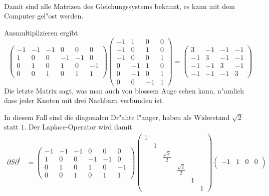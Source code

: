 \begin{loesung}
\begin{teilaufgaben}
\begin{align*}
\end{align*}
Damit sind alle Matrizen des Gleichungssystems bekannt, es kann mit
dem Computer gel"ost werden.
\item Ausmultiplizieren ergibt
\[
\begin{pmatrix}
-1&-1&-1& 0& 0& 0\\
 1& 0& 0&-1&-1& 0\\
 0& 1& 0& 1& 0&-1\\
 0& 0& 1& 0& 1& 1
\end{pmatrix}
\begin{pmatrix}
  -1&  1&  0&  0\\
  -1&  0&  1&  0\\
  -1&  0&  0&  1\\
   0& -1&  1&  0\\
   0& -1&  0&  1\\
   0&  0& -1&  1
\end{pmatrix}
=\begin{pmatrix}
   3& -1& -1& -1\\
  -1&  3& -1& -1\\
  -1& -1&  3& -1\\
  -1& -1& -1&  3
\end{pmatrix}
\]
Die letzte Matrix sagt, was man auch von blossem Auge sehen kann,
n"amlich dass jeder Knoten mit drei Nachbarn verbunden ist.
\item In diesem Fall sind die diagonalen Dr"ahte l"anger, haben
als Widerstand $\sqrt{2}$ statt $1$. Der Laplace-Operator wird 
damit
\begin{align*}
\partial S\partial^t
&=
\begin{pmatrix}
-1&-1&-1& 0& 0& 0\\
 1& 0& 0&-1&-1& 0\\
 0& 1& 0& 1& 0&-1\\
 0& 0& 1& 0& 1& 1
\end{pmatrix}
\begin{pmatrix}
1& &                &                & & \\
 &1&                &                & & \\
 & &\frac{\sqrt{2}}2&                & & \\
 & &                &\frac{\sqrt{2}}2& & \\
 & &                &                &1& \\
 & &                &                & &1
\end{pmatrix}
\begin{pmatrix}
  -1&  1&  0&  0\\

\end{pmatrix}
\end{align*}
\end{teilaufgaben}
\end{loesung}
